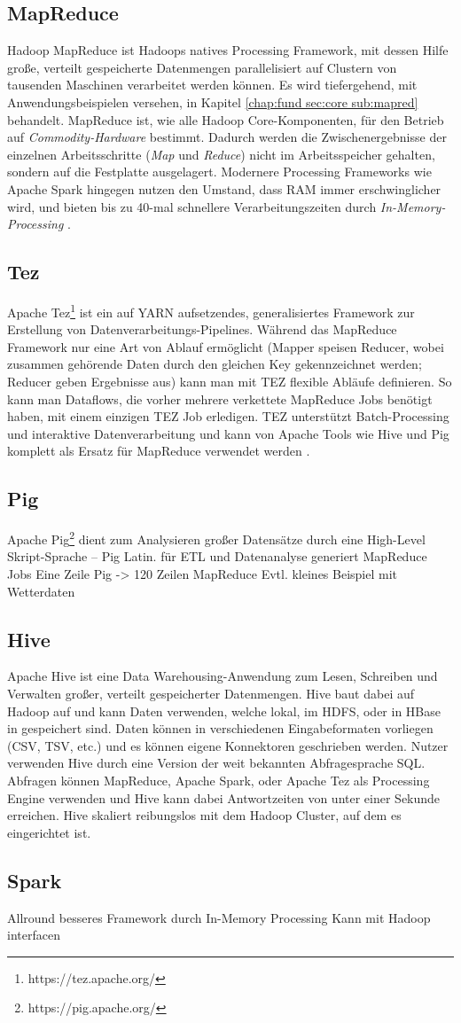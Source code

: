 \subsection{MapReduce}
Hadoop MapReduce ist Hadoops natives Processing Framework, mit dessen Hilfe große, verteilt gespeicherte Datenmengen parallelisiert auf Clustern von tausenden Maschinen verarbeitet werden können. Es wird tiefergehend, mit Anwendungsbeispielen versehen, in Kapitel \ref{chap:fund sec:core sub:mapred} behandelt. MapReduce ist, wie alle Hadoop Core-Komponenten, für den Betrieb auf \textit{Commodity-Hardware} bestimmt. Dadurch werden die Zwischenergebnisse der einzelnen Arbeitsschritte (\textit{Map} und \textit{Reduce}) nicht im Arbeitsspeicher gehalten, sondern auf die Festplatte ausgelagert. Modernere Processing Frameworks wie Apache Spark hingegen nutzen den Umstand, dass RAM immer erschwinglicher wird, und bieten bis zu 40-mal schnellere Verarbeitungszeiten durch \textit{In-Memory-Processing} \cite[vgl.][Kap. 3.19]{freiknecht_big_2018}.
\subsection{Tez}
Apache Tez\footnote{https://tez.apache.org/} ist ein auf YARN aufsetzendes, generalisiertes Framework zur Erstellung von Datenverarbeitungs-Pipelines. Während das MapReduce Framework nur eine Art von Ablauf ermöglicht (Mapper speisen Reducer, wobei zusammen gehörende Daten durch den gleichen Key gekennzeichnet werden; Reducer geben Ergebnisse aus) kann man mit TEZ flexible Abläufe definieren. So kann man Dataflows, die vorher mehrere verkettete MapReduce Jobs benötigt haben, mit einem einzigen TEZ Job erledigen. TEZ unterstützt Batch-Processing und interaktive Datenverarbeitung und kann von Apache Tools wie Hive und Pig komplett als Ersatz für MapReduce verwendet werden \parencite[vgl.][]{noauthor_apache_nodate-2}.
\subsection{Pig}
Apache Pig\footnote{https://pig.apache.org/} dient zum Analysieren großer Datensätze durch eine High-Level Skript-Sprache -- Pig Latin. für ETL und Datenanalyse
generiert MapReduce Jobs
Eine Zeile Pig -> 120 Zeilen MapReduce
Evtl. kleines Beispiel mit Wetterdaten
\subsection{Hive}
Apache Hive ist eine Data Warehousing-Anwendung zum Lesen, Schreiben und Verwalten großer, verteilt gespeicherter Datenmengen. Hive baut dabei auf Hadoop auf und kann Daten verwenden, welche lokal, im HDFS, oder in HBase in gespeichert sind. Daten können in verschiedenen Eingabeformaten vorliegen (CSV, TSV, etc.) und es können eigene Konnektoren geschrieben werden. Nutzer verwenden Hive durch eine Version der weit bekannten Abfragesprache SQL. Abfragen können MapReduce, Apache Spark, oder Apache Tez als Processing Engine verwenden und Hive kann dabei Antwortzeiten von unter einer Sekunde erreichen. Hive skaliert reibungslos mit dem Hadoop Cluster, auf dem es eingerichtet ist.\parencite{noauthor_apache_2020}
\subsection{Spark}
Allround besseres Framework durch In-Memory Processing
Kann mit Hadoop interfacen
